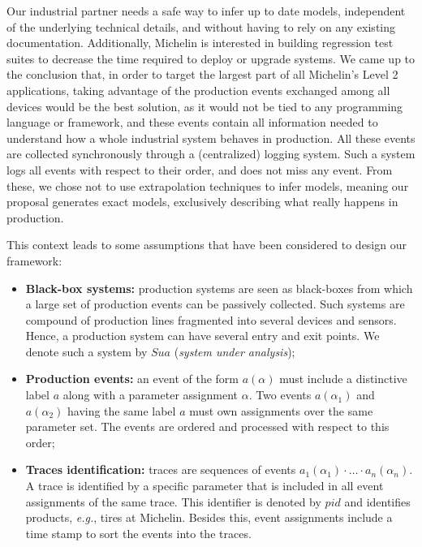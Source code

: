 Our industrial partner needs a safe way to infer up to date
models, independent of the underlying technical details, and
without having to rely on any existing documentation.
Additionally, Michelin is interested in building regression test
suites to decrease the time required to deploy or upgrade
systems. We came up to the conclusion that, in order to target
the largest part of all Michelin's Level 2 applications, taking
advantage of the production events exchanged among all devices
would be the best solution, as it would not be tied to any
programming language or framework, and these events contain all
information needed to understand how a whole industrial system
behaves in production. All these events are collected
synchronously through a (centralized) logging system. Such a
system logs all events with respect to their order, and does not
miss any event.  From these, we chose not to use extrapolation
techniques to infer models, meaning our proposal generates
exact models, exclusively describing what really happens
in production.

This context leads to some assumptions that have been considered
to design our framework:

\begin{itemize}
    \item \textbf{Black-box systems:} production systems are seen as
        black-boxes from which a large set of production events can
        be passively collected. Such systems are compound of
        production lines fragmented into several devices and sensors.
        Hence, a production system can have several entry and exit
        points. We denote such a system by $\mathit{Sua}$ (\emph{system
        under analysis});

    \item \textbf{Production events:} an event of the form
        $a(\alpha)$ must include a distinctive label $a$ along with a
        parameter assignment $\alpha$. Two events $a(\alpha_1)$ and
        $a(\alpha_2)$ having the same label $a$ must own assignments
        over the same parameter set. The events are ordered and
        processed with respect to this order;

    \item \textbf{Traces identification:} traces are sequences of
        events $a_1(\alpha_1) \cdot \dots \cdot a_n(\alpha_n)$. A
        trace is identified by a specific parameter that is
        included in all event assignments of the same trace. This
        identifier is denoted by $pid$ and identifies products,
        \emph{e.g.}, tires at Michelin.  Besides this, event
        assignments include a time stamp to sort the events into
        the traces.
\end{itemize}

